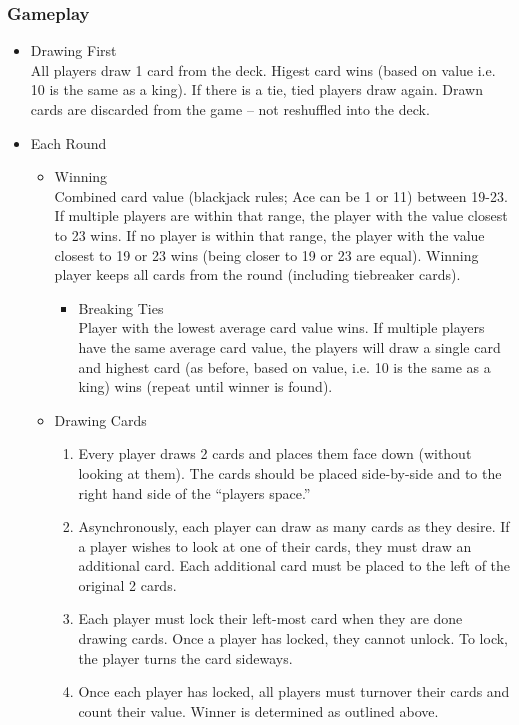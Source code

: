 \documentclass[11pt]{article}
\begin{document}
\subsubsection{Gameplay}
\label{sec-1-2-2}
\begin{itemize}

\item Drawing First\\
\label{sec-1-2-2-1}%
All players draw 1 card from the deck. Higest card wins (based on
value i.e. 10 is the same as a king). If there is a tie, tied players
draw again. Drawn cards are discarded from the game -- not reshuffled
into the deck.


\item Each Round
\label{sec-1-2-2-2}%

\begin{itemize}

\item Winning\\
\label{sec-1-2-2-2-1}%
Combined card value (blackjack rules; Ace can be 1 or 11) between
19-23. If multiple players are within that range, the player with the
value closest to 23 wins. If no player is within that range, the
player with the value closest to 19 or 23 wins (being closer to 19 or
23 are equal). Winning player keeps all cards from the round
(including tiebreaker cards). 

\begin{itemize}

\item Breaking Ties\\
\label{sec-1-2-2-2-1-1}%
Player with the lowest average card value wins. If multiple players
have the same average card value, the players will draw a single card
and highest card (as before, based on value, i.e. 10 is the same as a
king) wins (repeat until winner is found).

\end{itemize} %

\item Drawing Cards
\label{sec-1-2-2-2-2}%
\begin{enumerate}
\item Every player draws 2 cards and places them face down (without
   looking at them). The cards should be placed side-by-side and to
   the right hand side of the ``players space.''
\item Asynchronously, each player can draw as many cards as they desire.
   If a player wishes to look at one of their cards, they must draw
   an additional card. Each additional card must be placed to the
   left of the original 2 cards.
\item Each player must lock their left-most card when they are done
   drawing cards. Once a player has locked, they cannot unlock. To
   lock, the player turns the card sideways.
\item Once each player has locked, all players must turnover their cards
   and count their value. Winner is determined as outlined above.
\end{enumerate}


\end{itemize} %
\end{itemize} %
\end{document}
